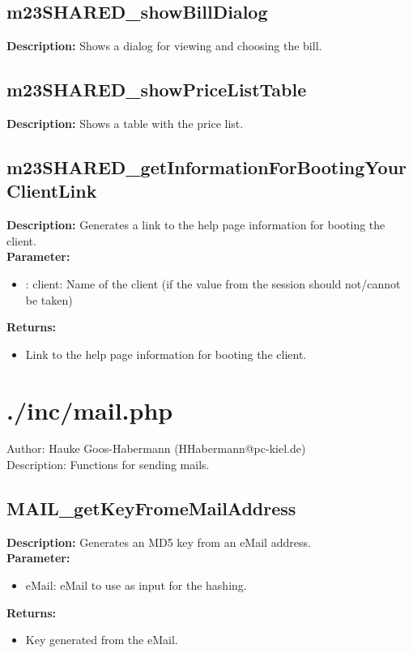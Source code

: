 \subsection{m23SHARED\_showBillDialog}
\textbf{Description:} Shows a dialog for viewing and choosing the bill.\\

\subsection{m23SHARED\_showPriceListTable}
\textbf{Description:} Shows a table with the price list.\\

\subsection{m23SHARED\_getInformationForBootingYourClientLink}
\textbf{Description:} Generates a link to the help page information for booting the client.\\
\textbf{Parameter:}
\begin{itemize}
\item : client: Name of the client (if the value from the session should not/cannot be taken)
\end{itemize}
\textbf{Returns:}
\begin{itemize}
\item Link to the help page information for booting the client.
\end{itemize}

\newpage\section{./inc/mail.php}
 Author: Hauke Goos-Habermann (HHabermann@pc-kiel.de)\\
 Description: Functions for sending mails.\\

\subsection{MAIL\_getKeyFromeMailAddress}
\textbf{Description:} Generates an MD5 key from an eMail address.\\
\textbf{Parameter:}
\begin{itemize}
\item eMail: eMail to use as input for the hashing.
\end{itemize}
\textbf{Returns:}
\begin{itemize}
\item Key generated from the eMail.
\end{itemize}

